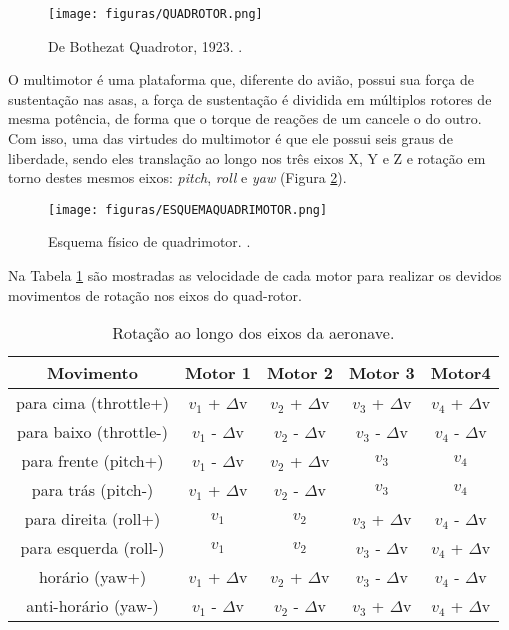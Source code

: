 \begin{figure}
	\centering
	\texttt{[image: figuras/QUADROTOR.png]}
    \caption{De Bothezat Quadrotor, 1923. \cite{Quadcopter}.}
    \label{QUADROTOR}
\end{figure}

O multimotor é uma plataforma que, diferente do avião, possui sua força de sustentação nas asas, a força de sustentação é dividida em múltiplos rotores de mesma potência, de forma que o torque de reações de um cancele o do outro. Com isso, uma das virtudes do multimotor é que ele possui seis graus de liberdade, sendo eles translação ao longo nos três eixos X, Y e Z e rotação em torno destes mesmos eixos: \textit{pitch}, \textit{roll} e \textit{yaw} (Figura \ref{ESQUEMAQUADRIMOTOR}).

\begin{figure}
	\centering
	\texttt{[image: figuras/ESQUEMAQUADRIMOTOR.png]}
    \caption{Esquema físico de quadrimotor. \cite{MOzuysal}.}
    \label{ESQUEMAQUADRIMOTOR}
\end{figure}

Na Tabela \ref{tab03} são mostradas as velocidade de cada motor para realizar os devidos movimentos de rotação nos eixos do quad-rotor.

\begin{table}
	\label{tab03}
	\centering
    \begin{tabular}{ | c | c | c | c | c |}
    \hline
    Movimento & Motor 1 & Motor 2 & Motor 3 & Motor4 \\ \hline
    para cima (throttle+) & $v_1$ + $\varDelta$v & $v_2$ + $\varDelta$v & $v_3$ + $\varDelta$v & $v_4$ + $\varDelta$v \\ \hline
    para baixo (throttle-) & $v_1$ - $\varDelta$v & $v_2$ - $\varDelta$v & $v_3$ - $\varDelta$v & $v_4$ - $\varDelta$v \\ \hline
    para frente (pitch+) & $v_1$ - $\varDelta$v & $v_2$ + $\varDelta$v & $v_3$ & $v_4$ \\ \hline
    para trás (pitch-) & $v_1$ + $\varDelta$v & $v_2$ - $\varDelta$v & $v_3$ & $v_4$ \\ \hline
    para direita (roll+) & $v_1$ & $v_2$ & $v_3$ + $\varDelta$v & $v_4$ - $\varDelta$v \\ \hline
    para esquerda (roll-) & $v_1$ & $v_2$ & $v_3$ - $\varDelta$v & $v_4$ + $\varDelta$v \\ \hline
    horário (yaw+) & $v_1$ + $\varDelta$v & $v_2$ + $\varDelta$v & $v_3$ - $\varDelta$v & $v_4$ - $\varDelta$v \\ \hline
    anti-horário (yaw-) & $v_1$ - $\varDelta$v & $v_2$ - $\varDelta$v & $v_3$ + $\varDelta$v & $v_4$ + $\varDelta$v \\
    \hline
    \end{tabular}
    \caption{Rotação ao longo dos eixos da aeronave.}
\end{table}

